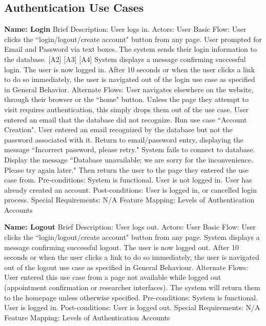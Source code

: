\subsection{Authentication Use Cases}
\begin{outline}[enumerate]

\1 {\bf Name: Login}
\2 Brief Description: User logs in.
\2 Actors: User
\2 Basic Flow:
\3 User clicks the ``login/logout/create account" button from any page.
\3 User prompted for Email and Password via text boxes.
\3 The system sends their login information to the database. [A2] [A3] [A4]
\3 System displays a message confirming successful login.  The user is now logged in.
\3 After 10 seconds or when the user clicks a link to do so immediately, the user is navigated out of the login use case as specified in General Behavior.
\2 Alternate Flows:
\3 [A1] User navigates elsewhere on the website, through their browser or the ``home" button.  Unless the page they attempt to visit requires authentication, this simply drops them out of the use case.
\3 [A2] User entered an email that the database did not recognize.  Run use case ``Account Creation".
\3 [A3] User entered an email recognized by the database but not the password associated with it.  Return to email/password entry, displaying the message ``Incorrect password, please retry."
\3 [A4] System fails to connect to database.  Display the message ``Database unavailable; we are sorry for the inconvenience.  Please try again later."  Then return the user to the page they entered the use case from.
\2 Pre-conditions:
\3 System is functional.
\3 User is not logged in.
\3 User has already created an account.
\2 Post-conditions:
\3 User is logged in, or cancelled login process.
\2 Special Requirements:
\3 N/A
\2 Feature Mapping:
\3 Levels of Authentication
\3 Accounts

\1 {\bf Name: Logout}
\2 Brief Description: User logs out.
\2 Actors: User
\2 Basic Flow:
\3 User clicks the ``login/logout/create account" button from any page.
\3 System displays a message confirming successful logout.  The user is now logged out.
\3 After 10 seconds or when the user clicks a link to do so immediately, the user is navigated out of the logout use case as specified in General Behaviour.
\2 Alternate Flows:
\3 [A1] User entered this use case from a page not available while logged out (appointment confirmation or researcher interfaces).  The system will return them to the homepage unless otherwise specified.
\2 Pre-conditions:
\3 System is functional.
\3 User is logged in.
\2 Post-conditions:
\3 User is logged out.
\2 Special Requirements:
\3 N/A
\2 Feature Mapping:
\3 Levels of Authentication
\3 Accounts


\end{outline}
